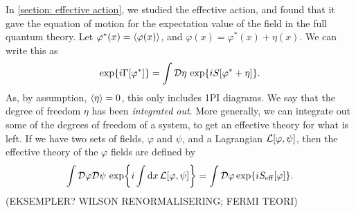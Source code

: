In \autoref{section: effective action}, we studied the effective action, and found that it gave the equation of motion for the expectation value of the field in the full quantum theory.
Let $\varphi^*(x) = \ex{\varphi(x)}$, and $\varphi(x) = \varphi^*(x) + \eta(x)$.
We can write this as
\begin{equation}
    \exp{i \Gamma[\varphi^*]} = \int \mathcal{D} \eta \, \exp{i S[\varphi^* + \eta]}.
\end{equation}
As, by assumption, $\ex{\eta} = 0$, this only includes 1PI diagrams.
We say that the degree of freedom $\eta$ has been \emph{integrated out}.
More generally, we can integrate out some of the degrees of freedom of a system, to get an effective theory for what is left.
If we have two sets of fields, $\varphi$ and $\psi$, and a Lagrangian $\mathcal{L}[\varphi, \psi]$, then the effective theory of the $\varphi$ fields are defined by
\begin{equation}
    \int \mathcal{D}\varphi \mathcal{D} \psi \, \exp{i\int \dd x\, \mathcal{L}[\varphi, \psi]}
    = \int \mathcal{D} \varphi \exp{i S_\mathrm{eff}[\varphi]}.
\end{equation}
(EKSEMPLER? WILSON RENORMALISERING; FERMI TEORI)


